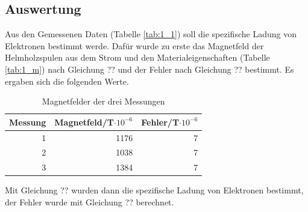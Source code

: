 \documentclass[12pt,a4paper]{article}
\begin{document}
\subsection{Auswertung}

Aus den Gemessenen Daten (Tabelle \ref{tab:1_1}) soll die spezifische Ladung von Elektronen bestimmt werde. Dafür wurde zu erste das Magnetfeld der Helmholzspulen aus dem Strom und den Materialeigenschaften (Tabelle \ref{tab:1_m}) nach Gleichung ?? und der Fehler nach Gleichung ??  bestimmt. Es ergaben sich die folgenden Werte.

\begin{table}[htbp]
\caption{Magnetfelder der drei Messungen}
\begin{center}
\begin{tabular}{|r|r|r|}
\hline
\multicolumn{1}{|l|}{Messung} & \multicolumn{1}{l|}{Magnetfeld/T$\cdot 10^{-6}$} & \multicolumn{1}{l|}{Fehler/T$\cdot 10^{-6}$} \\ \hline
1 & 1176 & 7 \\ \hline
2 & 1038 & 7 \\ \hline
3 & 1384 & 7 \\ \hline
\end{tabular}
\end{center}
\label{tab:aus_b}
\end{table}

Mit Gleichung ?? wurden dann die spezifische Ladung von Elektronen bestimmt, der Fehler wurde mit Gleichung ?? berechnet.
\end{document}
